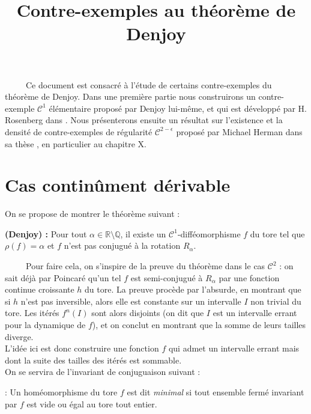 \documentclass[11pt,a4paper]{article}
\title{\textbf{Contre-exemples au théorème de Denjoy }}
\date{}
\begin{document}
\maketitle

\ \ \ \ \ Ce document est consacré à l'étude de certains contre-exemples du théorème de Denjoy. Dans une première partie nous construirons un contre-exemple $\mathcal{C}^1$ élémentaire proposé par Denjoy lui-même, et qui est développé par H. Rosenberg dans \cite{rosenberg}. Nous présenterons ensuite un résultat sur l'existence et la densité de contre-exemples de régularité $\mathcal{C}^{2-\epsilon}$ proposé par Michael Herman dans sa thèse \cite{herman}, en particulier au chapitre X.

\section{Cas continûment dérivable}

On se propose de montrer le théorème suivant :

\begin{theorem}\textbf{(Denjoy) : }
Pour tout $\alpha \in \mathbb{R} \setminus \mathbb{Q}$, il existe un $\mathcal{C}^1$-difféomorphisme $f$ du tore tel que $\rho(f)=\alpha$ et $f$ n'est pas conjugué à la rotation $R_\alpha$.
\end{theorem}

\ \ \ \ \ Pour faire cela, on s'inspire de la preuve du théorème dans le cas $\mathcal{C}^2$ : on sait déjà par Poincaré qu'un tel $f$ est semi-conjugué à $R_\alpha$ par une fonction continue croissante $h$ du tore. La preuve procède par l'absurde, en montrant que si $h$ n'est pas inversible, alors elle est constante sur un intervalle $I$ non trivial du tore. Les itérés $f^n(I)$ sont alors disjoints (on dit que $I$ est un intervalle errant pour la dynamique de $f$), et on conclut en montrant que la somme de leurs tailles diverge. \\ 
L'idée ici est donc construire une fonction $f$ qui admet un intervalle errant mais dont la suite des tailles des itérés est sommable. \\

On se servira de l'invariant de conjuguaison suivant : 

\begin{defin} : Un homéomorphisme du tore $f$ est dit \textit{minimal} si tout ensemble fermé invariant par  $f$ est vide ou égal au tore tout entier. 
\end{defin}
\end{document}

